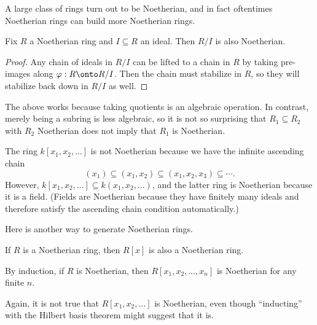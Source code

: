 A large class of rings turn out to be Noetherian, and in fact oftentimes Noetherian rings can build more Noetherian rings.
\begin{prop} \label{prop:noetherianquot}
	Fix $R$ a Noetherian ring and $I\subseteq R$ an ideal. Then $R/I$ is also Noetherian.
\end{prop}
\begin{proof}
	Any chain of ideals in $R/I$ can be lifted to a chain in $R$ by taking pre-images along $\varphi:R\onto R/I$. Then the chain must stabilize in $R$, so they will stabilize back down in $R/I$ as well.
\end{proof}
The above works because taking quotients is an algebraic operation. In contrast, merely being a subring is less algebraic, so it is not so surprising that $R_1\subseteq R_2$ with $R_2$ Noetherian does not imply that $R_1$ is Noetherian.
\begin{ex}
	The ring $k[x_1,x_2,\ldots]$ is not Noetherian because we have the infinite ascending chain
	\[(x_1)\subseteq(x_1,x_2)\subseteq(x_1,x_2,x_3)\subseteq\cdots.\]
	However, $k[x_1,x_2,\ldots]\subseteq k(x_1,x_2,\ldots)$, and the latter ring is Noetherian because it is a field. (Fields are Noetherian because they have finitely many ideals and therefore satisfy the ascending chain condition automatically.)
\end{ex}
Here is another way to generate Noetherian rings.
\begin{theorem} \label{thm:hilbasis}
	If $R$ is a Noetherian ring, then $R[x]$ is also a Noetherian ring.
\end{theorem}
\begin{corollary} \label{cor:inducthilbertbasis}
	By induction, if $R$ is Noetherian, then $R[x_1,x_2,\ldots,x_n]$ is Noetherian for any finite $n$.
\end{corollary}
\begin{warn}
	Again, it is not true that $R[x_1,x_2,\ldots]$ is Noetherian, even though ``inducting'' with the Hilbert basis theorem might suggest that it is.
\end{warn}
